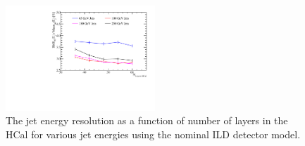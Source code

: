 \begin{figure}[h!]
\centering
\includegraphics[width=0.5\textwidth]{OptimisationStudies/Plots/JetEnergyResolutions/JER_vs_NumberOfHCalLayersOfFixedDepth.pdf}
\caption[The jet energy resolution as a function of number of layers in the HCal for various jet energies using the nominal ILD detector model.]{The jet energy resolution as a function of number of layers in the HCal for various jet energies using the nominal ILD detector model.}
\label{fig:hcalnfixedlayers}
\end{figure}

